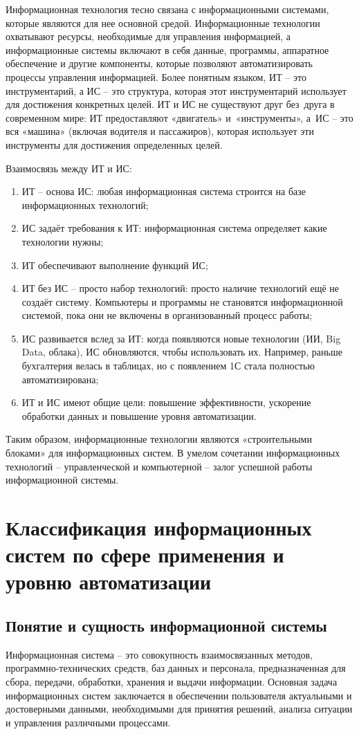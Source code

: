 \documentclass{ou}
\begin{document}
Информационная технология тесно связана с информационными системами, которые являются для нее основной средой. Информационные технологии охватывают ресурсы, необходимые для управления информацией, а информационные системы включают в себя данные, программы, аппаратное обеспечение и другие компоненты, которые позволяют автоматизировать процессы управления информацией. Более понятным языком, ИТ -- это инструментарий, а ИС -- это структура, которая этот инструментарий использует для достижения конкретных целей. ИТ и ИС не существуют друг без~друга в современном мире: ИТ предоставляют «двигатель» и~«инструменты», а~ИС -- это вся «машина» (включая водителя и пассажиров), которая использует эти инструменты для достижения определенных целей.

Взаимосвязь между ИТ и ИС:
\begin{enumerate}[leftmargin=0em, itemindent=3.75em, nosep, label=\arabic*)]
\item ИТ – основа ИС: любая информационная система строится на базе информационных технологий;
\item ИС задаёт требования к ИТ: информационная система определяет какие технологии нужны;
\item ИТ обеспечивают выполнение функций ИС;
\item ИТ без ИС -- просто набор технологий: просто наличие технологий ещё не создаёт систему. Компьютеры и программы не становятся информационной системой, пока они не включены в организованный процесс работы;
\item ИС развивается вслед за ИТ: когда появляются новые технологии (ИИ, Big Data, облака), ИС обновляются, чтобы использовать их. Например, раньше бухгалтерия велась в таблицах, но с появлением 1С стала полностью автоматизирована;
\item ИТ и ИС имеют общие цели: повышение эффективности, ускорение обработки данных и повышение уровня автоматизации.
\end{enumerate}

Таким образом, информационные технологии являются «строительными блоками» для информационных систем. В умелом сочетании информационных технологий -- управленческой и компьютерной -- залог успешной работы информационной системы.
\newpage
\section{Классификация информационных систем по сфере применения и уровню автоматизации}
\subsection{Понятие и сущность информационной системы}
Информационная система -- это совокупность взаимосвязанных методов, программно-технических средств, баз данных и персонала, предназначенная для сбора, передачи, обработки, хранения и выдачи информации. Основная задача информационных систем заключается в обеспечении пользователя актуальными и достоверными данными, необходимыми для принятия решений, анализа ситуации и управления различными процессами.
\end{document}
